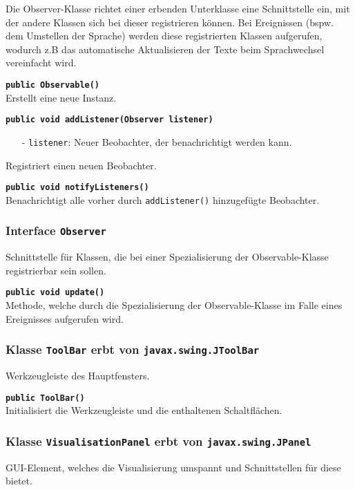 \documentclass[parskip=full,11pt,twoside]{scrartcl}
\begin{document}
Die Observer-Klasse richtet einer erbenden Unterklasse eine Schnittstelle ein, mit der andere Klassen sich bei dieser registrieren können. Bei Ereignissen (bspw. dem Umstellen der Sprache) werden diese registrierten Klassen aufgerufen, wodurch z.B das automatische Aktualisieren der Texte beim Sprachwechsel vereinfacht wird.

\textbf{\texttt{public Observable()}}\\
Erstellt eine neue Instanz.

\textbf{\texttt{public void addListener(Observer listener)}}
\begin{itemize}[noitemsep]
	\item[-] \texttt{listener}: Neuer Beobachter, der benachrichtigt werden kann.
\end{itemize}
Registriert einen neuen Beobachter.

\textbf{\texttt{public void notifyListeners()}}\\
Benachrichtigt alle vorher durch \texttt{addListener()} hinzugefügte Beobachter.

\subsubsection{Interface \texttt{Observer}}

Schnittstelle für Klassen, die bei einer Spezialisierung der Observable-Klasse registrierbar sein sollen.

\textbf{\texttt{public void update()}}\\
Methode, welche durch die Spezialisierung der Observable-Klasse im Falle eines Ereignisses aufgerufen wird.

\subsubsection{Klasse \texttt{ToolBar} erbt von \texttt{javax.swing.JToolBar}}

Werkzeugleiste des Hauptfensters.

\textbf{\texttt{public ToolBar()}}\\
Initialisiert die Werkzeugleiste und die enthaltenen Schaltflächen.

\subsubsection{Klasse \texttt{VisualisationPanel} erbt von \texttt{javax.swing.JPanel}}

GUI-Element, welches die Visualisierung umspannt und Schnittstellen für diese bietet.
\end{document}
